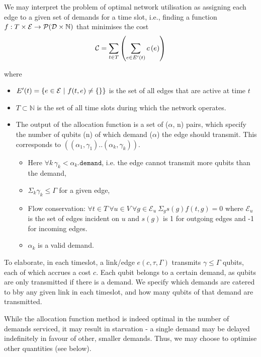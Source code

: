 \documentclass{amsart}
\begin{document}
    We may interpret the problem of optimal network utilisation as assigning each edge to a given set of demands for a time slot, i.e., finding a function \(f : T \times \mathcal{E} \rightarrow \mathcal{P}(\mathcal{D \times \mathbb{N}})\) that minimises the cost 
        \[\mathcal{C} = \sum_{t \in T} \left(\sum_{e \in E'(t)} c\left(e\right)\right)\]


    where \begin{itemize}
        \item \(E'(t) = \left\{e \in \mathcal{E} \ |\  f(t, e) \neq \{\} \right\}\) is the set of all edges that are active at time \(t\)
        \item \(T \subset \mathbb{N}\) is the set of all time slots during which the network operates.
        \item The output of the allocation function is a set of (\(\alpha\), n) pairs, which specify the number of qubits (n) of which demand (\(\alpha\)) the edge should transmit. This corresponds to \(((\alpha_1, \gamma_1)..(\alpha_k, \gamma_k))\).
         \begin{itemize}
            \item  Here \(\forall k\, \gamma_k < \alpha_k\texttt{.demand}\), i.e. the edge cannot transmit more qubits than the demand,
            \item \(\Sigma_k \gamma_k \leq \Gamma\) for a given edge, 
            \item Flow conservation: \(\forall t \in T\ \forall u \in V\ \forall g \in \mathcal{E}_u\  \Sigma_g s(g)f(t, g) = 0\) where \(\mathcal{E}_u\) is the set of edges incident on \(u\) and \(s(g)\) is 1 for outgoing edges and -1 for incoming edges.
            \item \(\alpha_k\) is a valid demand.
        \end{itemize}
    \end{itemize}

    To elaborate, in each timeslot, a link/edge \(e(c, \tau ,\Gamma)\) transmits \(\gamma \leq \Gamma\) qubits, each of which accrues a cost \(c\). Each qubit belongs to a certain demand, as qubits are only transmitted if there is a demand. We specify which demands are catered to bby any given link in each timeslot, and how many qubits of that demand are transmitted.

    While the allocation function method is indeed optimal in the number of demands serviced, it may result in starvation - a single demand may be delayed indefinitely in favour of other, smaller demands. Thus, we may choose to optimise other quantities (see below).
\end{document}
